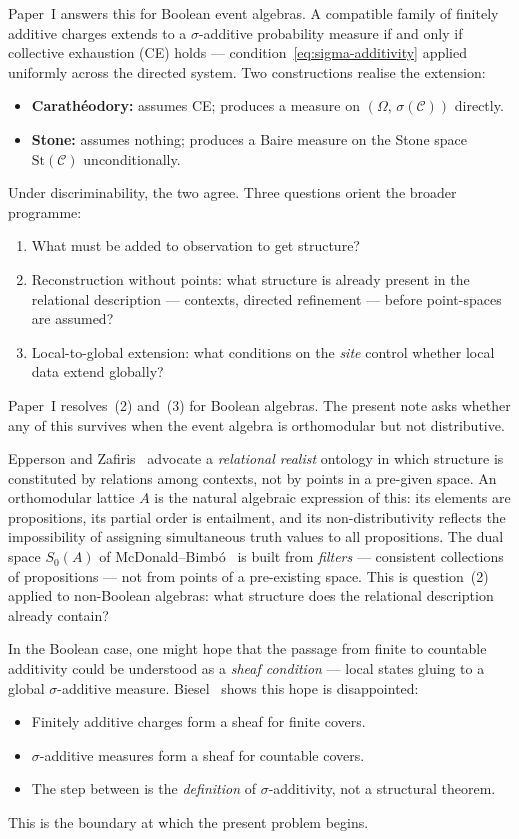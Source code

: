 \documentclass[11pt]{article}
\theoremstyle{definition}
\newcommand{\Ccal}{\mathcal{C}}
\newcommand{\St}{\mathrm{St}}
\begin{document}
Paper~I answers this for Boolean event algebras.  A compatible
family of finitely additive charges extends to a $\sigma$-additive
probability measure if and only if collective exhaustion (CE) holds
--- condition~\eqref{eq:sigma-additivity} applied uniformly across
the directed system.  Two constructions realise the extension:
\begin{itemize}[noitemsep]
  \item \textbf{Carath\'{e}odory:} assumes CE; produces a measure
    on $(\Omega,\, \sigma(\Ccal))$ directly.
  \item \textbf{Stone:} assumes nothing; produces a Baire measure
    on the Stone space $\St(\Ccal)$ unconditionally.
\end{itemize}
Under discriminability, the two agree.  Three questions orient the
broader programme:
\begin{enumerate}[label=(\arabic*)]
  \item What must be added to observation to get structure?
  \item Reconstruction without points: what structure is already
    present in the relational description --- contexts, directed
    refinement --- before point-spaces are assumed?
  \item Local-to-global extension: what conditions on the
    \emph{site} control whether local data extend globally?
\end{enumerate}
Paper~I resolves~(2) and~(3) for Boolean algebras.  The present
note asks whether any of this survives when the event algebra is
orthomodular but not distributive.

Epperson and Zafiris~\cite{EppersonZafiris2013} advocate a
\emph{relational realist} ontology in which structure is
constituted by relations among contexts, not by points in a
pre-given space.  An orthomodular lattice $A$ is the natural
algebraic expression of this: its elements are propositions, its
partial order is entailment, and its non-distributivity reflects
the impossibility of assigning simultaneous truth values to all
propositions.  The dual space $S_0(A)$ of
McDonald--Bimb\'{o}~\cite{McDonaldBimbo2023} is built from
\emph{filters} --- consistent collections of propositions --- not
from points of a pre-existing space.  This is question~(2) applied
to non-Boolean algebras: what structure does the relational
description already contain?

In the Boolean case, one might hope that the passage from finite to
countable additivity could be understood as a \emph{sheaf condition}
--- local states gluing to a global $\sigma$-additive measure.
Biesel~\cite{Biesel2024} shows this hope is disappointed:
\begin{itemize}[noitemsep]
  \item Finitely additive charges form a sheaf for finite covers.
  \item $\sigma$-additive measures form a sheaf for countable
    covers.
  \item The step between is the \emph{definition} of
    $\sigma$-additivity, not a structural theorem.
\end{itemize}
This is the boundary at which the present problem begins.
\end{document}
